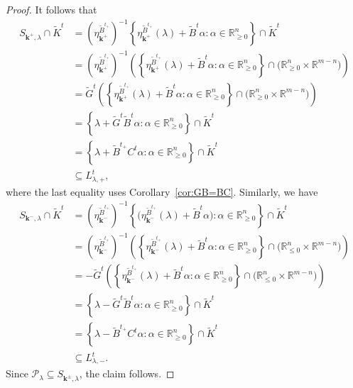 \documentclass{amsart}
\numberwithin{theorem}{section}
\newcommand{\bfk}{{\boldsymbol{k}}}
\newcommand{\cP}{\mathcal{P}}
\newcommand{\RR}{\mathbb{R}}
\begin{document}
\begin{proof}
    It follows that
    \begin{align*}
      S_{\bfk^+,\lambda}\cap \widetilde K^t
      &= \left(\eta^{\widetilde B^{t_+}}_{\bfk^+}\right)^{-1}\left\{\eta^{\widetilde B^{t_+}}_{\bfk^+}(\lambda)+\widetilde B^t\alpha:\alpha\in\RR^n_{\ge0}\right\}\cap \widetilde K^t\\
      &= \left(\eta^{\widetilde B^{t_+}}_{\bfk^+}\right)^{-1}\left(\left\{\eta^{\widetilde B^{t_+}}_{\bfk^+}(\lambda)+\widetilde B^t\alpha:\alpha\in\RR^n_{\ge0}\right\}\cap \big( \RR_{\ge0}^n\times \RR^{m-n}\big)\right)\\
      &= \widetilde G^t \left(\left\{\eta^{\widetilde B^{t_+}}_{\bfk^+}(\lambda)+\widetilde B^t\alpha:\alpha\in\RR^n_{\ge0}\right\}\cap \big( \RR_{\ge0}^n\times \RR^{m-n}\big)\right)\\
      &= \left\{\lambda+\widetilde G^t \widetilde B^t\alpha:\alpha\in\RR^n_{\ge0}\right\}\cap \widetilde K^t\\
      &= \left\{\lambda+\widetilde B^{t_+} C^t \alpha:\alpha\in\RR^n_{\ge0}\right\}\cap \widetilde K^t\\
      &\subseteq L^t_{\lambda,+},
    \end{align*}
    where the last equality uses Corollary~\ref{cor:GB=BC}.
    Similarly, we have
    \begin{align*}
      S_{\bfk^-,\lambda}\cap \widetilde K^t
      &= \left(\eta^{\widetilde B^{t_+}}_{\bfk^-}\right)^{-1}\left\{\big(\eta^{\widetilde B^{t_+}}_{\bfk^-}(\lambda)+\widetilde B^t\alpha\big):\alpha\in\RR^n_{\ge0}\right\}\cap \widetilde K^t\\
      &= \left(\eta^{\widetilde B^{t_+}}_{\bfk^-}\right)^{-1}\left(\left\{\eta^{\widetilde B^{t_+}}_{\bfk^-}(\lambda)+\widetilde B^t\alpha:\alpha\in\RR^n_{\ge0}\right\}\cap \big( \RR_{\le0}^n\times \RR^{m-n}\big)\right)\\
      &= -\widetilde G^t \left(\left\{\eta^{\widetilde B^{t_+}}_{\bfk^-}(\lambda)+\widetilde B^t\alpha:\alpha\in\RR^n_{\ge0}\right\}\cap \big( \RR_{\le0}^n\times \RR^{m-n}\big)\right)\\
      &= \left\{\lambda-\widetilde G^t \widetilde B^t\alpha:\alpha\in\RR^n_{\ge0}\right\}\cap \widetilde K^t\\
      &= \left\{\lambda-\widetilde B^{t_+} C^t \alpha:\alpha\in\RR^n_{\ge0}\right\}\cap \widetilde K^t\\
      &\subseteq L^t_{\lambda,-}.
    \end{align*}
    Since $\cP_\lambda\subseteq S_{\bfk^\pm,\lambda}$, the claim follows.
  \end{proof}
\end{document}
